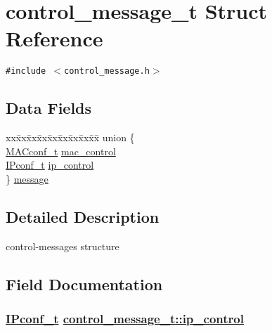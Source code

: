 \hypertarget{structcontrol__message__t}{
\section{control\_\-message\_\-t Struct Reference}
\label{structcontrol__message__t}
}
{\tt \#include $<$control\_\-message.h$>$}

\subsection*{Data Fields}
\begin{CompactItemize}
\item 
\begin{tabbing}
xx\=xx\=xx\=xx\=xx\=xx\=xx\=xx\=xx\=\kill
union \{\\
\>\hyperlink{structMACconf__t}{MACconf\_t} \hyperlink{structcontrol__message__t_2f1fbfa937648a9d40ef18da0dd85a26}{mac\_control}\\
\>\hyperlink{structIPconf__t}{IPconf\_t} \hyperlink{structcontrol__message__t_a7fedb2fdb523167bdbcc1a1fbde5576}{ip\_control}\\
\} \hyperlink{structcontrol__message__t_75a5f0af56a265cf8491405c290fef02}{message}\\

\end{tabbing}\end{CompactItemize}


\subsection{Detailed Description}
control-messages structure 



\subsection{Field Documentation}
\hypertarget{structcontrol__message__t_a7fedb2fdb523167bdbcc1a1fbde5576}{
\subsubsection[ip\_\-control]{\setlength{\rightskip}{0pt plus 5cm}\hyperlink{structIPconf__t}{IPconf\_\-t} \hyperlink{structcontrol__message__t_a7fedb2fdb523167bdbcc1a1fbde5576}{control\_\-message\_\-t::ip\_\-control}}}
\label{structcontrol__message__t_a7fedb2fdb523167bdbcc1a1fbde5576}


